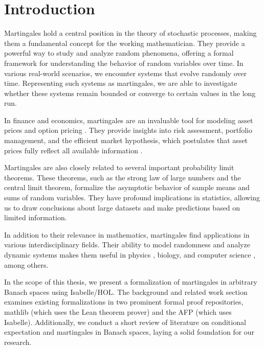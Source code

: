 ﻿%

\chapter{Introduction}\label{chapter:introduction}

Martingales hold a central position in the theory of stochastic processes, making them a fundamental concept for the working mathematician. They provide a powerful way to study and analyze random phenomena, offering a formal framework for understanding the behavior of random variables over time. In various real-world scenarios, we encounter systems that evolve randomly over time. Representing such systems as martingales, we are able to investigate whether these systems remain bounded or converge to certain values in the long run.

In finance and economics, martingales are an invaluable tool for modeling asset prices \cite{fama1965} and option pricing \cite{Musiela_Rutkowski_2005}. They provide insights into risk assessment, portfolio management, and the efficient market hypothesis, which postulates that asset prices fully reflect all available information \cite{yaes1989}. 

Martingales are also closely related to several important probability limit theorems. These theorems, such as the strong law of large numbers and the central limit theorem, formalize the asymptotic behavior of sample means and sums of random variables. They have profound implications in statistics, allowing us to draw conclusions about large datasets and make predictions based on limited information.

In addition to their relevance in mathematics, martingales find applications in various interdisciplinary fields. Their ability to model randomness and analyze dynamic systems makes them useful in physics \cite{roldan2023}, biology, and computer science \cite{mitzenmacher_upfal_2005}, among others.

In the scope of this thesis, we present a formalization of martingales in arbitrary Banach spaces using Isabelle/HOL. The background and related work section examines existing formalizations in two prominent formal proof repositories, \textsf{mathlib} (which uses the Lean theorem prover) and the \textsf{\ac{AFP}} (which uses Isabelle). Additionally, we conduct a short review of literature on conditional expectation and martingales in Banach spaces, laying a solid foundation for our research.

